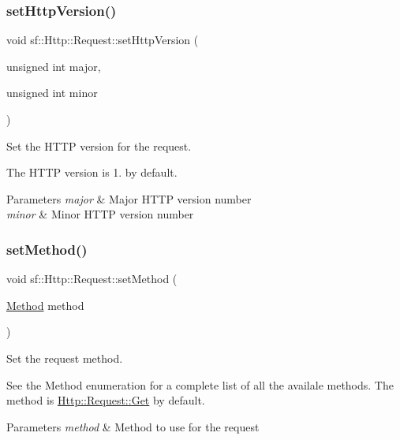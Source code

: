 \subsubsection{\texorpdfstring{set\+Http\+Version()}{setHttpVersion()}}
{\footnotesize\ttfamily void sf\+::\+Http\+::\+Request\+::set\+Http\+Version (\begin{DoxyParamCaption}\item[{unsigned int}]{major,  }\item[{unsigned int}]{minor }\end{DoxyParamCaption})}



Set the H\+T\+TP version for the request. 

The H\+T\+TP version is 1. by default.


\begin{DoxyParams}{Parameters}
{\em major} & Major H\+T\+TP version number \\
\hline
{\em minor} & Minor H\+T\+TP version number \\
\hline
\end{DoxyParams}
\mbox{\label{classsf_1_1_http_1_1_request_abab148554e873e80d2e41376fde1cb62}} 
\subsubsection{\texorpdfstring{set\+Method()}{setMethod()}}
{\footnotesize\ttfamily void sf\+::\+Http\+::\+Request\+::set\+Method (\begin{DoxyParamCaption}\item[{\hyperlink{classsf_1_1_http_1_1_request_a620f8bff6f43e1378f321bf53fbf5598}{Method}}]{method }\end{DoxyParamCaption})}



Set the request method. 

See the Method enumeration for a complete list of all the availale methods. The method is \hyperlink{classsf_1_1_http_1_1_request_a620f8bff6f43e1378f321bf53fbf5598ab822baed393f3d0353621e5378b9fcb4}{Http\+::\+Request\+::\+Get} by default.


\begin{DoxyParams}{Parameters}
{\em method} & Method to use for the request \\
\hline
\end{DoxyParams}
\mbox{\label{classsf_1_1_http_1_1_request_a3723de4b4f1a14b744477841c4ac22e6}} 
